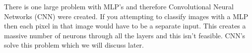 There is one large problem with MLP's and therefore Convolutional Neural
Networks (CNN) were created. If you attempting to classify images with a MLP then
each pixel in that image would have to be a separate input. This creates a
massive number of neurons through all the layers and this isn't feasible. CNN's
solve this problem which we will discuss later.


